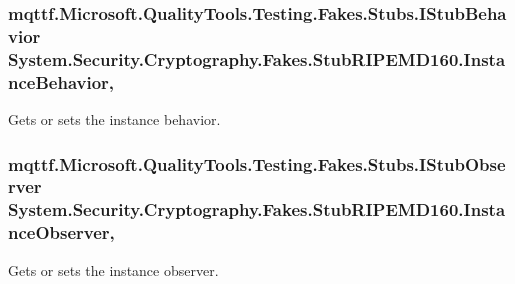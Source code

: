 \hypertarget{class_system_1_1_security_1_1_cryptography_1_1_fakes_1_1_stub_r_i_p_e_m_d160_a992e943a2cef31d0303c44b74a71191c}{
\subsubsection[{Instance\-Behavior}]{\setlength{\rightskip}{0pt plus 5cm}mqttf.\-Microsoft.\-Quality\-Tools.\-Testing.\-Fakes.\-Stubs.\-I\-Stub\-Behavior System.\-Security.\-Cryptography.\-Fakes.\-Stub\-R\-I\-P\-E\-M\-D160.\-Instance\-Behavior\hspace{0.3cm}{\ttfamily [get]}, {\ttfamily [set]}}}\label{class_system_1_1_security_1_1_cryptography_1_1_fakes_1_1_stub_r_i_p_e_m_d160_a992e943a2cef31d0303c44b74a71191c}


Gets or sets the instance behavior.

\hypertarget{class_system_1_1_security_1_1_cryptography_1_1_fakes_1_1_stub_r_i_p_e_m_d160_a18d32edd4193e4c6421c67a265eb9f51}{
\subsubsection[{Instance\-Observer}]{\setlength{\rightskip}{0pt plus 5cm}mqttf.\-Microsoft.\-Quality\-Tools.\-Testing.\-Fakes.\-Stubs.\-I\-Stub\-Observer System.\-Security.\-Cryptography.\-Fakes.\-Stub\-R\-I\-P\-E\-M\-D160.\-Instance\-Observer\hspace{0.3cm}{\ttfamily [get]}, {\ttfamily [set]}}}\label{class_system_1_1_security_1_1_cryptography_1_1_fakes_1_1_stub_r_i_p_e_m_d160_a18d32edd4193e4c6421c67a265eb9f51}


Gets or sets the instance observer.

